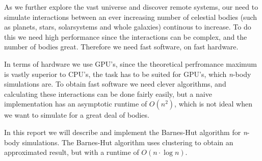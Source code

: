 As we further explore the vast universe and discover remote systems, our need to
simulate interactions between an ever increasing number of celestial bodies
(such as planets, stars, solarsystems and whole galaxies) continous to increase.
To do this we need high performance since the interactions can be complex, and
the number of bodies great. Therefore we need fast software, on fast hardware.

In terms of hardware we use GPU's, since the theoretical perfromance maximum
is vastly superior to CPU's, the task has to be suited for GPU's, which
\textit{n}-body simulations are. To obtain fast software we need clever algorithms,
and calculating these interactions can be done fairly easily, but a naive
implementation has an asymptotic runtime of $O(n^2)$, which is not ideal when we
want to simulate for a great deal of bodies.

In this report we will describe and implement the Barnes-Hut algorithm for
\textit{n}-body simulations. The Barnes-Hut algorithm uses clustering to obtain
an approximated result, but with a runtime of $O(n \cdot \log{n})$.
